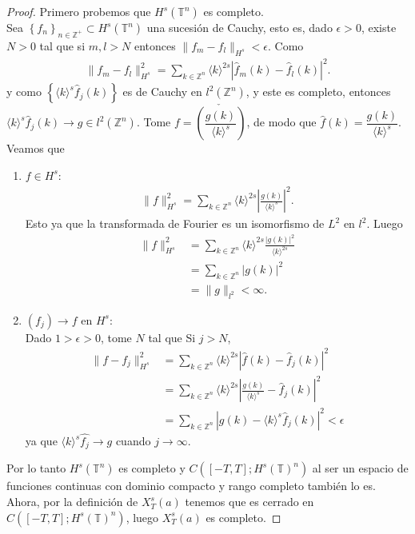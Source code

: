     \begin{proof}
        Primero probemos que $H^{s}(\mathbb{T}^{n})$ es completo.\\
        Sea $\left\{ f_{n} \right\} _{n \in \mathbb{Z}^{+}} \subset H^{s}(\mathbb{T}^{n})$ una sucesión de Cauchy, esto es, dado $\epsilon >0$, existe $N>0$ tal que si $m,l >N$ entonces $\|f_{m} - f_{l}\|_{H^{s}} < \epsilon$. Como
    \begin{align*}
        \|f_{m} - f_{l}\|^{2}_{H^{s}} = \sum_{k \in \mathbb{Z}^{n}} \langle k \rangle ^{2s} |\hat{f}_{m}(k) - \hat{f}_{l}(k) |^{2}.
    \end{align*}
    y como $\left\{ \langle k \rangle  ^{s} \hat{f}_{j}(k) \right\}$ es de Cauchy en $l^{2}(\mathbb{Z}^{n})$, y este es completo, entonces $\langle k \rangle ^{s} \hat{f}_{j}(k) \rightarrow g \in l^{2}(\mathbb{Z}^{n})$. Tome $f = \check{\left( \dfrac{g(k)}{\langle k \rangle ^{s}} \right)}$, de modo que $\hat{f}(k) = \dfrac{g(k)}{\langle k \rangle ^{s}}$.\\ 
    Veamos que 
    \begin{enumerate}
        \item $f \in H^{s}$:
            \begin{align*}
                \|f\|^{2}_{H^{s}}  = \sum_{k \in \mathbb{Z}^{n}} \langle k \rangle ^{2s}  \left| \frac{g(k)}{\langle k \rangle ^{s}} \right| ^{2}.
            \end{align*}
        Esto ya que la transformada de Fourier es un isomorfismo de $L^2$ en $l^2$. Luego
        \begin{align*}
            \|f\|^{2}_{H^{s}}  &= \sum_{k \in \mathbb{Z}^{n}} \langle k \rangle ^{2s} \frac{|g(k)|^{2}}{\langle k \rangle ^{2s}}\\
            &= \sum_{k \in \mathbb{Z}^{n}} |g(k)|^{2}\\
            &= \|g\|_{l^{2}} < \infty.
        \end{align*}
        \item $ \left( f_{j} \right) \rightarrow f$ en $H^{s}$:\\
            Dado $1>\epsilon >0$, tome $N$ tal que Si $j>N$, 
            \begin{align*}
                \|f - f_{j}\|^{2}_{H^{s}} &= \sum_{k \in \mathbb{Z}^{n}} \langle k \rangle ^{2s} |\hat{f}(k) - \hat{f}_{j}(k)|^{2}\\
                &= \sum_{k \in \mathbb{Z}^{n}} \langle k \rangle ^{2s}  \left| \frac{g(k)}{\langle k \rangle ^{s}} - \hat{f}_{j}(k) \right| ^{2} \\
                &= \sum_{k \in \mathbb{Z}^{n}} \left| g(k) - \langle k \rangle ^{s} \hat{f}_{j}(k) \right| ^{2} < \epsilon
            \end{align*}
            ya que $\langle k\rangle^s\hat{f_j} \to g$ cuando $j\to \infty$.
    \end{enumerate}
    Por lo tanto $H^{s}(\mathbb{T}^{n})$ es completo y $C([-T, T]; H^{s}(\mathbb{T})^{n})$ al ser un espacio de funciones continuas con dominio compacto y rango completo también lo es.\\
    Ahora, por la definición de $X^{s}_{T} (a)$ tenemos que es cerrado en $C([-T, T]; H^{s}(\mathbb{T})^{n})$, luego $X^{s}_{T} (a)$ es completo.
    \end{proof}
